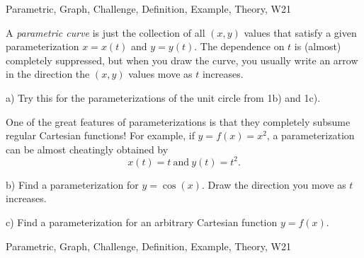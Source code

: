 \begin{tagblock}{Parametric, Graph, Challenge, Definition, Example, Theory, W21}
\begin{question}
A \textit{parametric curve} is just the collection of all $(x,y)$ values that satisfy a given parameterization $x=x(t)$ and $y=y(t)$. The dependence on $t$ is (almost) completely suppressed, but when you draw the curve, you usually write an arrow in the direction the $(x,y)$ values move as $t$ increases.

\bigskip

a) Try this for the parameterizations of the unit circle from 1b) and 1c).

\bigskip

One of the great features of parameterizations is that they completely subsume regular Cartesian functions! For example, if $y=f(x)=x^2$, a parameterization can be almost cheatingly obtained by 
\[
x(t)=t \ \textrm{and} \ y(t)=t^2.
\] 

\bigskip
 
b) Find a parameterization for $y=\cos(x)$. Draw the direction you move as $t$ increases. 

\bigskip

c) Find a parameterization for an arbitrary Cartesian function $y=f(x)$.
	
	
\begin{tags}
	    Parametric, Graph, Challenge, Definition, Example, Theory, W21
\end{tags}
	
\begin{diary}
\end{diary}
	
\begin{solution}
	   
\end{solution}
	
\end{question}

\end{tagblock}


